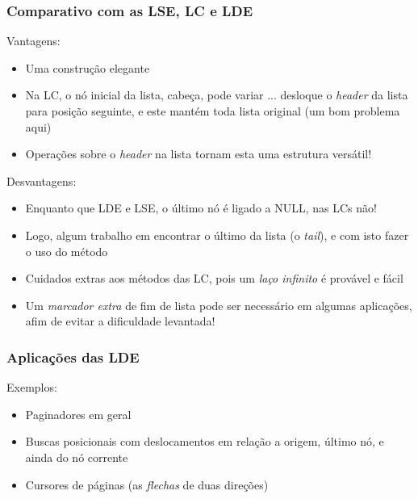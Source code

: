 \begin{frame}
\frametitle{Comparativo com as LSE, LC e LDE}

\begin{block}{Vantagens:}
\begin{itemize}
  \item Uma construção elegante 
  \item Na LC, o nó inicial da lista,  cabeça, pode variar ... desloque o \textit{header}  da  lista   para   posição seguinte, e este mantém toda lista original (um bom problema aqui)
  
  \item Operações sobre o \textit{header} na lista tornam esta uma estrutura versátil!
\end{itemize}
\end{block}

\begin{block}{Desvantagens:}
\begin{itemize}
  \item Enquanto que LDE e LSE, o último nó é ligado a NULL, nas LCs não!
  \item Logo, algum trabalho  em encontrar o último da lista (o \textit{tail}), e 
  com isto fazer o uso do método
  
  \item Cuidados extras aos métodos das LC, pois um \textit{laço infinito} é provável e fácil
  
  \item Um \textit{marcador extra} de fim de lista pode ser necessário em
  algumas aplicações, afim de evitar a dificuldade levantada!
  
\end{itemize}
\end{block}
\end{frame} 



\begin{frame}
\frametitle{Aplicações das LDE}

\begin{block}{Exemplos:}
\begin{itemize}
  \item Paginadores em geral
  \item Buscas posicionais com deslocamentos em relação a origem,
  último nó, e ainda do nó corrente
  \item Cursores de páginas (as \textit{flechas} de duas direções)
  
\end{itemize}
\end{block}

\end{frame} 





